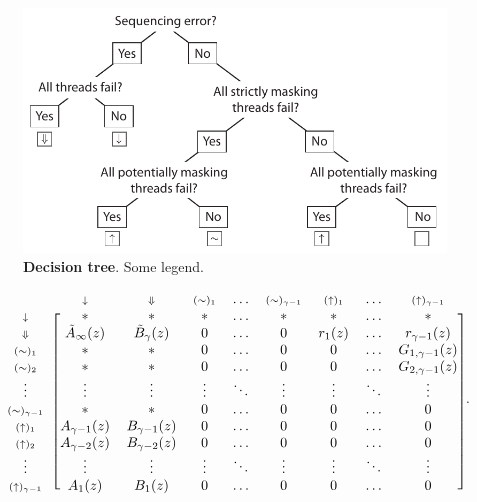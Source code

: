 \documentclass{article}
\newcommand{\DN}{\scriptstyle{\Downarrow}}
\newcommand{\dn}{\scriptstyle{\downarrow}}
\newcommand{\up}[1]{\scriptstyle{(\uparrow)_{#1}}}
\newcommand{\eq}[1]{\scriptstyle{(\sim)_{#1}}}
\begin{document}
\begin{figure}[h]
\centering
\includegraphics[scale=.7]{decision_tree.pdf}
\caption{\textbf{Decision tree}. 
Some legend.}
\label{fig:decision_tree}
\end{figure}



\begin{equation*}
\begin{blockarray}{ccccccccc}
   & \dn & \DN &\eq{1} & \ldots & \eq{\gamma-1} &
    \up{1} & \ldots & \up{\gamma-1} \\
\begin{block}{c[cccccccc]}
\dn & * & * & * & \ldots & * & * & \ldots & * \\
\DN & \tilde{A}_\infty(z) & \tilde{B}_\gamma(z) & 0 & \ldots & 0 &
    r_1(z) & \ldots & r_{\gamma-1}(z) \\
\eq{1} & * & * & 0 & \ldots & 0 & 0 & \ldots & G_{1,\gamma-1}(z) \\
\eq{2} & * & * & 0 & \ldots & 0 & 0 & \ldots & G_{2,\gamma-1}(z) \\
\vdots & \vdots & \vdots & \vdots & \ddots & \vdots & \vdots &
    \ddots & \vdots \\
\eq{\gamma-1} & * & * & 0 & \ldots & 0 & 0 & \ldots & 0 \\
\up{1} & A_{\gamma-1}(z) & B_{\gamma-1}(z) & 0 & \ldots & 0 & 0 &
    \ldots & 0 \\
\up{2} & A_{\gamma-2}(z) & B_{\gamma-2}(z) & 0 & \ldots & 0 & 0 &
    \ldots & 0  \\
\vdots & \vdots & \vdots & \vdots & \ddots & \vdots & \vdots &
    \ddots & \vdots \\
\up{\gamma-1} & A_1(z) & B_1(z) & 0 & \ldots & 0 & 0 & \ldots & 0 \\
\end{block}
\end{blockarray}.
\end{equation*}
\end{document}
